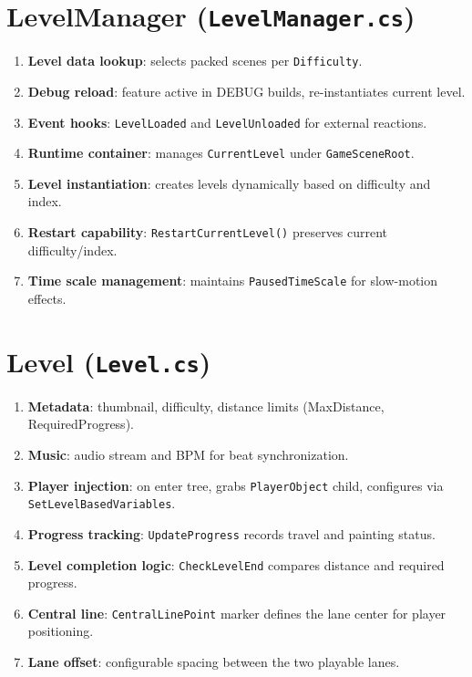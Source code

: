\documentclass{report}
\begin{document}
\section{LevelManager (\texttt{LevelManager.cs})}
\begin{enumerate}[label=\alph*)]
	\item\textbf{Level data lookup}: selects packed scenes per \texttt{Difficulty}.
	\item\textbf{Debug reload}: feature active in DEBUG builds, re-instantiates current level.
	\item\textbf{Event hooks}: \texttt{LevelLoaded} and \texttt{LevelUnloaded} for external reactions.
	\item\textbf{Runtime container}: manages \texttt{CurrentLevel} under \texttt{GameSceneRoot}.
	\item\textbf{Level instantiation}: creates levels dynamically based on difficulty and index.
	\item\textbf{Restart capability}: \texttt{RestartCurrentLevel()} preserves current difficulty/index.
	\item\textbf{Time scale management}: maintains \texttt{PausedTimeScale} for slow-motion effects.
\end{enumerate}

\section{Level (\texttt{Level.cs})}
\begin{enumerate}[label=\alph*)]
	\item\textbf{Metadata}: thumbnail, difficulty, distance limits (MaxDistance, RequiredProgress).
	\item\textbf{Music}: audio stream and BPM for beat synchronization.
	\item\textbf{Player injection}: on enter tree, grabs \texttt{PlayerObject} child, configures via \texttt{SetLevelBasedVariables}.
	\item\textbf{Progress tracking}: \texttt{UpdateProgress} records travel and painting status.
	\item\textbf{Level completion logic}: \texttt{CheckLevelEnd} compares distance and required progress.
	\item\textbf{Central line}: \texttt{CentralLinePoint} marker defines the lane center for player positioning.
	\item\textbf{Lane offset}: configurable spacing between the two playable lanes.
\end{enumerate}
\end{document}
